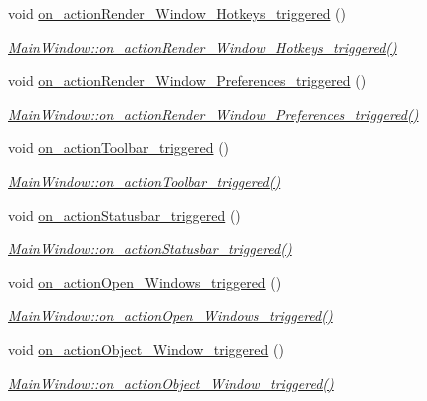 \begin{DoxyCompactItemize}
void \hyperlink{class_main_window_a06cab8e06cb83d2e79c4bdd0e0cd5a88}{on\+\_\+action\+Render\+\_\+\+Window\+\_\+\+Hotkeys\+\_\+triggered} ()
\begin{DoxyCompactList}\small\item\em \hyperlink{class_main_window_a06cab8e06cb83d2e79c4bdd0e0cd5a88}{Main\+Window\+::on\+\_\+action\+Render\+\_\+\+Window\+\_\+\+Hotkeys\+\_\+triggered()} \end{DoxyCompactList}\item 
void \hyperlink{class_main_window_a0361ab994394a05a31374b9e5b873d3b}{on\+\_\+action\+Render\+\_\+\+Window\+\_\+\+Preferences\+\_\+triggered} ()
\begin{DoxyCompactList}\small\item\em \hyperlink{class_main_window_a0361ab994394a05a31374b9e5b873d3b}{Main\+Window\+::on\+\_\+action\+Render\+\_\+\+Window\+\_\+\+Preferences\+\_\+triggered()} \end{DoxyCompactList}\item 
void \hyperlink{class_main_window_a0f037e29b645ecfd6a256136bfc1ee38}{on\+\_\+action\+Toolbar\+\_\+triggered} ()
\begin{DoxyCompactList}\small\item\em \hyperlink{class_main_window_a0f037e29b645ecfd6a256136bfc1ee38}{Main\+Window\+::on\+\_\+action\+Toolbar\+\_\+triggered()} \end{DoxyCompactList}\item 
void \hyperlink{class_main_window_a37848047e4bc8594a3e83e75bd6383cf}{on\+\_\+action\+Statusbar\+\_\+triggered} ()
\begin{DoxyCompactList}\small\item\em \hyperlink{class_main_window_a37848047e4bc8594a3e83e75bd6383cf}{Main\+Window\+::on\+\_\+action\+Statusbar\+\_\+triggered()} \end{DoxyCompactList}\item 
void \hyperlink{class_main_window_a60eede6fe328bc95cccfe0c6d4a7696e}{on\+\_\+action\+Open\+\_\+\+Windows\+\_\+triggered} ()
\begin{DoxyCompactList}\small\item\em \hyperlink{class_main_window_a60eede6fe328bc95cccfe0c6d4a7696e}{Main\+Window\+::on\+\_\+action\+Open\+\_\+\+Windows\+\_\+triggered()} \end{DoxyCompactList}\item 
void \hyperlink{class_main_window_a584ef402e75f991b95af6dadbaac6354}{on\+\_\+action\+Object\+\_\+\+Window\+\_\+triggered} ()
\begin{DoxyCompactList}\small\item\em \hyperlink{class_main_window_a584ef402e75f991b95af6dadbaac6354}{Main\+Window\+::on\+\_\+action\+Object\+\_\+\+Window\+\_\+triggered()} \end{DoxyCompactList}\item 

\end{DoxyCompactItemize}
